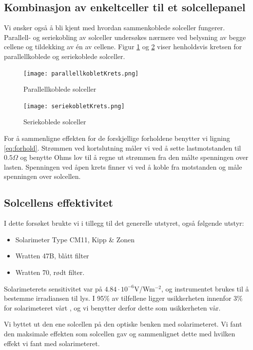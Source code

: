 \documentclass[a4paper,11pt, twocolumn]{article}
\begin{document}
\subsection{Kombinasjon av enkeltceller til et solcellepanel}
Vi ønsker også å bli kjent med hvordan sammenkoblede solceller fungerer. Parallell- og seriekobling av solceller undersøkes nærmere ved belysning av begge cellene og tildekking av \'en av cellene. Figur \ref{fig:parallell} og \ref{fig:serie} viser henholdsvis kretsen for parallellkoblede og seriekoblede solceller.
\begin{figure}[!ht]
	\texttt{[image: parallellkobletKrets.png]}
	\caption{Parallellkoblede solceller}
	\label{fig:parallell}
\end{figure}

\begin{figure}[!ht]
	\texttt{[image: seriekobletKrets.png]}
	\caption{Seriekoblede solceller}
	\label{fig:serie}
\end{figure}

For å sammenligne effekten for de forskjellige forholdene benytter vi ligning \eqref{eq:forhold}. Strømmen ved kortslutning måler vi ved å sette lastmotstanden til $0.5\Omega$ og benytte Ohms lov til å regne ut strømmen fra den målte spenningen over lasten. Spenningen ved åpen krets finner vi ved å koble fra motstanden og måle spenningen over solcellen.

\subsection{Solcellens effektivitet}
I dette forsøket brukte vi i tillegg til det generelle utstyret, også følgende utstyr:

\begin{itemize}
	\item Solarimeter Type CM11, Kipp \& Zonen
	\item Wratten 47B, blått filter
	\item Wratten 70, rødt filter.
\end{itemize}
Solarimeterets sensitivitet var på $4.84\cdot10^{-6}$V/Wm$^{-2}$, og instrumentet brukes til å bestemme irradiansen til lys. I 95\% av tilfellene ligger usikkerheten innenfor 3\% for solarimeteret vårt \cite{KippZonen}, og vi benytter derfor dette som usikkerheten vår.

Vi byttet ut den ene solcellen på den optiske benken med solarimeteret. Vi fant den maksimale effekten som solcellen gav og sammenlignet dette med hvilken effekt vi fant med solarimeteret. 
\end{document}
